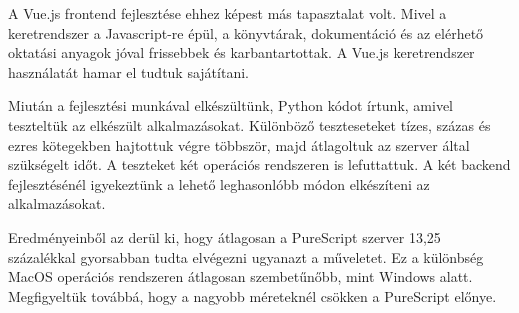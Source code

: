 \documentclass[12pt]{article}
\begin{document}
A Vue.js frontend fejlesztése ehhez képest más tapasztalat volt. Mivel a keretrendszer a Javascript-re épül,  a könyvtárak, dokumentáció és az elérhető oktatási anyagok jóval frissebbek és karbantartottak. A Vue.js keretrendszer használatát hamar el tudtuk sajátítani.

Miután a fejlesztési munkával elkészültünk, Python kódot írtunk, amivel teszteltük az elkészült alkalmazásokat. Különböző teszteseteket tízes, százas és ezres kötegekben hajtottuk végre többször, majd átlagoltuk az szerver által szükségelt időt. A teszteket két operációs rendszeren is lefuttattuk. A két backend fejlesztésénél igyekeztünk a lehető leghasonlóbb módon elkészíteni az alkalmazásokat.

Eredményeinből az derül ki, hogy átlagosan a PureScript szerver 13,25 százalékkal gyorsabban tudta elvégezni ugyanazt a műveletet. Ez a különbség MacOS operációs rendszeren átlagosan szembetűnőbb, mint Windows alatt. Megfigyeltük továbbá, hogy a nagyobb méreteknél csökken a PureScript előnye.




\end{document}
